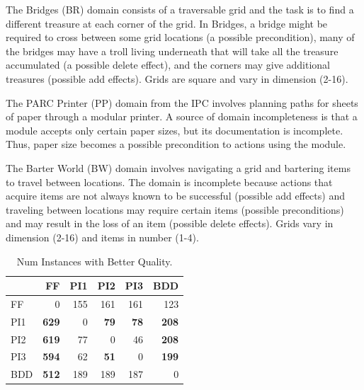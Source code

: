 \documentclass[letterpaper]{article}
\begin{document}
The Bridges (BR) domain consists of a traversable grid and the task is to find a
different treasure at each corner of the grid. In Bridges,
a bridge might be required  to cross between some grid locations (a possible
precondition), many of the bridges may have a troll living
underneath that will take all the treasure accumulated (a possible delete
effect), and the corners may give additional treasures (possible add
effects).  Grids are square and vary in dimension (2-16).

The PARC Printer (PP) domain from the IPC involves planning paths for sheets of
paper through a modular printer.  A source of domain incompleteness is that a module
accepts only certain paper sizes, but its documentation is incomplete.  Thus,
paper size becomes a possible precondition to actions using the module.

The Barter World (BW) domain involves navigating a grid and bartering items to
travel between locations.  The domain is incomplete because actions that acquire
 items are not always known to be successful (possible add effects) and traveling between locations may require
certain items (possible preconditions) and may result in the loss of an item
(possible delete effects). Grids vary in dimension (2-16) and items
in number (1-4).




\begin{table}\centering \begin{tabular}{|l|rrrrr|}      \hline &  FF  & 
PI1 & PI2  &  PI3  &  BDD  \\\hline
FF	&		0		&		155		&		161		&		161		&		123		\\
PI1	&	{\bf	629}	&		0		&	{\bf	79}	&	{\bf	78}	&	{\bf	208}	\\
PI2	&	{\bf	619}	&		77		&		0		&		46		&	{\bf	208}	\\
PI3	&	{\bf	594}	&		62		&	{\bf	51}	&		0		&	{\bf	199}	\\
BDD & {\bf 512} &  189  &  189  &  187  &  0  \\\hline
\end{tabular}																						
\caption{\label{tab:qualcomp} Num Instances with Better Quality.}
\end{table}
\end{document}
